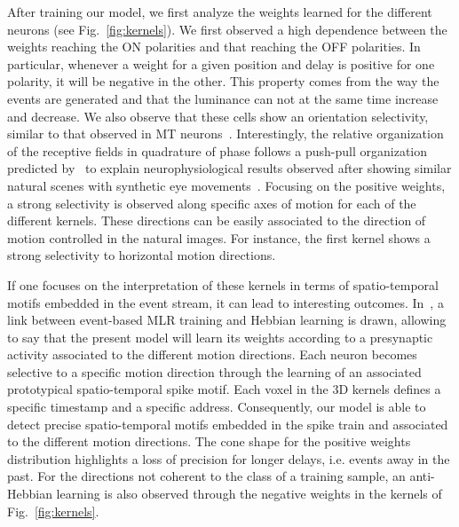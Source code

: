 \documentclass[default]{sn-jnl}%
\theoremstyle{thmstyleone}%
\theoremstyle{thmstyletwo}%
\theoremstyle{thmstylethree}%
\newcommand{\seeFig}[1]{see Fig.~\ref{fig:#1}}%
\begin{document}
%
%
After training our model, we first analyze the weights learned for the different neurons (\seeFig{kernels}). 
We first observed a high dependence between the weights reaching the ON polarities and that reaching the OFF polarities. In particular, whenever a weight for a given position and delay is positive for one polarity, it will be negative in the other. This property comes from the way the events are generated and that the luminance can not at the same time increase and decrease. %
We also observe that these cells show an orientation selectivity, similar to that observed in MT neurons~\citep{deangelis_functional_1999}. Interestingly, the relative organization of the receptive fields in quadrature of phase follows a push-pull organization predicted by~\citet{kremkow_push-pull_2016} to explain neurophysiological results observed after showing similar natural scenes with synthetic eye movements~\citep{baudot_animation_2013}. Focusing on the positive weights, a strong selectivity is observed along specific axes of motion for each of the different kernels. These directions can be easily associated to the direction of motion controlled in the natural images. For instance, the first kernel shows a strong selectivity to horizontal motion directions.
%

If one focuses on the interpretation of these kernels in terms of spatio-temporal motifs embedded in the event stream, it can lead to interesting outcomes. In~\citep{grimaldi_robust_2022}, a link between event-based MLR training and Hebbian learning is drawn, allowing to say that the present model will learn its weights according to a presynaptic activity associated to the different motion directions. Each neuron becomes selective to a specific motion direction through the learning of an associated prototypical spatio-temporal spike motif. Each voxel in the 3D kernels defines a specific timestamp and a specific address. Consequently, our model is able to detect precise spatio-temporal motifs embedded in the spike train and associated to the different motion directions. The cone shape for the positive weights distribution highlights a loss of precision for longer delays, i.e. events away in the past. For the directions not coherent to the class of a training sample, an anti-Hebbian learning is also observed through the negative weights in the kernels of Fig.~\ref{fig:kernels}. 
\end{document}
